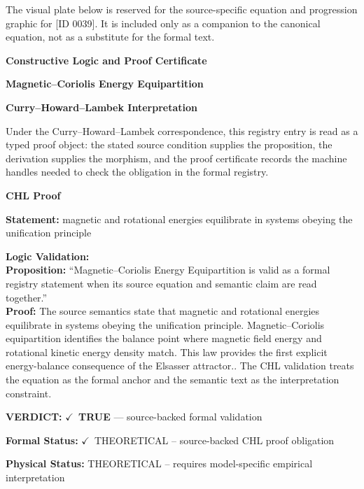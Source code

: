 \begingroup\footnotesize\sloppy
The visual plate below is reserved for the source-specific equation and progression graphic for [ID 0039]. It is included only as a companion to the canonical equation, not as a substitute for the formal text.
\par\endgroup
\ifTZPDarkEdition
{}
\fi

\clearpage
\begingroup\tzpsupportsetup
\noindent\textbf{\fontsize{10.8pt}{12.8pt}\selectfont [ID 0039] Constructive Logic and Proof Certificate}\par
\noindent\textbf{\fontsize{10pt}{12pt}\selectfont Magnetic--Coriolis Energy Equipartition}\par
\vspace{0.45em}
\begingroup
\footnotesize
\setlength{\parskip}{0.22em}
\setlength{\parindent}{0pt}
\noindent\textbf{Curry--Howard--Lambek Interpretation}\par
Under the Curry--Howard--Lambek correspondence, this registry entry is read as a typed proof
object: the stated source condition supplies the proposition, the derivation supplies the
morphism, and the proof certificate records the machine handles needed to check the obligation
in the formal registry.

\vspace{0.45em}
\noindent\textbf{CHL Proof}\par
\textbf{Statement:} magnetic and rotational energies equilibrate in systems obeying the unification
principle

\textbf{Logic Validation:}\\
\textbf{Proposition:} ``Magnetic--Coriolis Energy Equipartition is valid as a formal registry statement when its
source equation and semantic claim are read together.''\\
\textbf{Proof:} The source semantics state that magnetic and rotational energies equilibrate in systems
obeying the unification principle. Magnetic--Coriolis equipartition identifies the
balance point where magnetic field energy and rotational kinetic energy density match.
This law provides the first explicit energy-balance consequence of the Elsasser
attractor.. The CHL validation treats the equation as the formal anchor and the semantic
text as the interpretation constraint.

\textbf{VERDICT:} \ensuremath{\checkmark}\ \textbf{TRUE} --- source-backed formal validation

\textbf{Formal Status:} \ensuremath{\checkmark}\ THEORETICAL -- source-backed CHL proof obligation

\textbf{Physical Status:} THEORETICAL -- requires model-specific empirical interpretation
\par\vspace{0.45em}
\par
\ifTZPDarkEdition
{}
\fi
\endgroup
\endgroup
